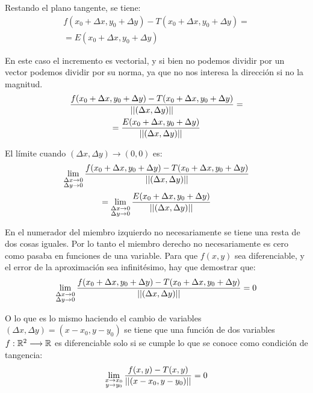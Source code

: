 Restando el plano tangente, se tiene:
\begin{multline*}
    f(x_0 + \Delta x,y_0 + \Delta y) - T(x_0 + \Delta x,y_0 + \Delta y) =
    \\
    = E(x_0 + \Delta x,y_0 + \Delta y)
\end{multline*}

En este caso el incremento es vectorial, y si bien no podemos dividir por un vector podemos dividir por su norma, ya que no nos interesa la dirección si no la magnitud.
\begin{multline*}
    \frac{f(x_0 + \Delta x,y_0 + \Delta y) - T(x_0 + \Delta x,y_0 + \Delta y)}{{\left|\left| {(\Delta x,\Delta y)} \right|\right|}} =
    \\
    = \frac{E(x_0 + \Delta x,y_0 + \Delta y)}{{\left|\left| {(\Delta x,\Delta y)} \right|\right|}}
\end{multline*}

El límite cuando $(\Delta x,\Delta y) \to (0,0)$ es:
\begin{multline*}
    \lim_{\substack{\Delta x \to 0 \\ \Delta y \to 0}} \frac{f(x_0 + \Delta x,y_0 + \Delta y) - T(x_0 + \Delta x,y_0 + \Delta y)}{{\left|\left| {(\Delta x,\Delta y)} \right|\right|}}
    \\
    = \lim_{\substack{\Delta x \to 0 \\ \Delta y \to 0}} \frac{E(x_0 + \Delta x,y_0 + \Delta y)}{{\left|\left| {(\Delta x,\Delta y)} \right|\right|}}
\end{multline*}

En el numerador del miembro izquierdo no necesariamente se tiene una resta de dos cosas iguales.
Por lo tanto el miembro derecho no necesariamente es cero como pasaba en funciones de una variable.
Para que $f(x,y)$ sea diferenciable, y el error de la aproximación sea infinitésimo, hay que demostrar que:
\begin{equation*}
    \lim_{\substack{\Delta x \to 0 \\ \Delta y \to 0}} \frac{f(x_0 + \Delta x,y_0 + \Delta y) - T(x_0 + \Delta x,y_0 + \Delta y)}{{\left|\left| {(\Delta x,\Delta y)} \right|\right|}} = 0
\end{equation*}

O lo que es lo mismo haciendo el cambio de variables $(\Delta x,\Delta y)=(x-x_0,y-y_0)$ se tiene que una función de dos variables $f:\mathbb{R}^2 \longrightarrow \mathbb{R}$ es diferenciable solo si se cumple lo que se conoce como condición de tangencia:
\begin{equation*}
    \lim_{\substack{x \to x_0 \\ y \to y_0}} \frac{f(x,y) - T(x,y)}{{\left|\left| {(x-x_0,y-y_0)} \right|\right|}} = 0
\end{equation*}


